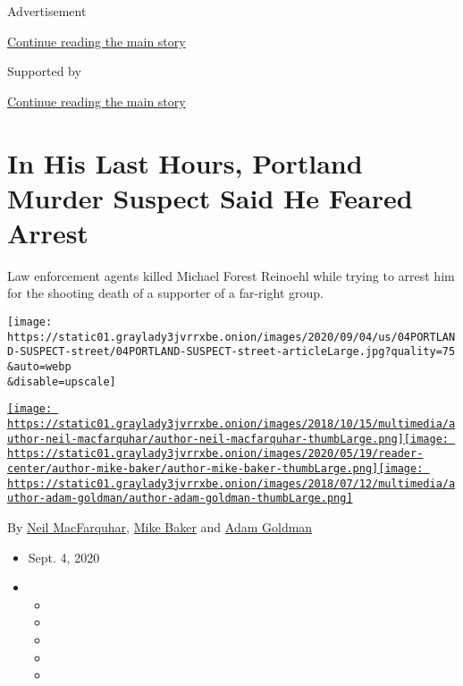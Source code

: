Advertisement

\protect\hyperlink{after-top}{Continue reading the main story}

Supported by

\protect\hyperlink{after-sponsor}{Continue reading the main story}

\hypertarget{in-his-last-hours-portland-murder-suspect-said-he-feared-arrest}{%
\section{In His Last Hours, Portland Murder Suspect Said He Feared
Arrest}\label{in-his-last-hours-portland-murder-suspect-said-he-feared-arrest}}

Law enforcement agents killed Michael Forest Reinoehl while trying to
arrest him for the shooting death of a supporter of a far-right group.

\texttt{[image: https://static01.graylady3jvrrxbe.onion/images/2020/09/04/us/04PORTLAND-SUSPECT-street/04PORTLAND-SUSPECT-street-articleLarge.jpg?quality=75\\\&auto=webp\\\&disable=upscale]}

\href{https://www.nytimes3xbfgragh.onion/by/neil-macfarquhar}{\texttt{[image: https://static01.graylady3jvrrxbe.onion/images/2018/10/15/multimedia/author-neil-macfarquhar/author-neil-macfarquhar-thumbLarge.png]}}\href{https://www.nytimes3xbfgragh.onion/by/mike-baker}{\texttt{[image: https://static01.graylady3jvrrxbe.onion/images/2020/05/19/reader-center/author-mike-baker/author-mike-baker-thumbLarge.png]}}\href{https://www.nytimes3xbfgragh.onion/by/adam-goldman}{\texttt{[image: https://static01.graylady3jvrrxbe.onion/images/2018/07/12/multimedia/author-adam-goldman/author-adam-goldman-thumbLarge.png]}}

By \href{https://www.nytimes3xbfgragh.onion/by/neil-macfarquhar}{Neil
MacFarquhar},
\href{https://www.nytimes3xbfgragh.onion/by/mike-baker}{Mike Baker} and
\href{https://www.nytimes3xbfgragh.onion/by/adam-goldman}{Adam Goldman}

\begin{itemize}
\item
  Sept. 4, 2020
\item
  \begin{itemize}
  \item
  \item
  \item
  \item
  \item
  \end{itemize}
\end{itemize}

